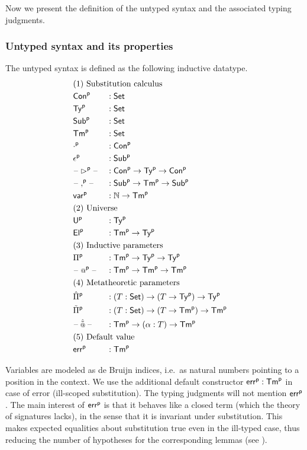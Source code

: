 Now we present the definition of the untyped syntax and the
associated typing judgments.

\subsubsection{Untyped syntax and its properties}

\begin{definition}
The untyped syntax is defined as the following inductive datatype.
\begin{alignat*}{5}
  & \rlap{(1) Substitution calculus} \\
  & \Conu && : \Set \\
  & \Tyu  && : \Set \\
  & \Subu  && : \Set \\
  & \Tmu  && : \Set \\
  & \emptyu && : \Conu \\
    & \epsilonu && : \Subu \\
  & \blank\extu\blank && : \Conu\ra\Tyu\ra\Conu \\
  & \blank\consu\blank && : \Subu\ra\Tmu\ra\Subu \\
  & \varu  && : \N \ra \Tmu \\
  & \rlap{(2) Universe} \\
  & \Uu && : \Tyu \\
  & \Elu && : \Tmu\ra\Tyu \\
  & \rlap{(3) Inductive parameters} \\
  & \Piu && : \Tmu\ra\Tyu\ra\Tyu \\
  & \blank\appu\blank && : \Tmu\ra\Tmu\ra \Tmu \\
  & \rlap{(4) Metatheoretic parameters} \\
  & \Pimu && : (T:\Set)\ra(T\ra\Tyu)\ra\Tyu \\
  & \Piiu && : (T:\Set)\ra(T\ra\Tmu)\ra\Tmu \\
  & \blank\appmu \blank && : \Tmu\ra(\alpha:T) \ra\Tmu\\
  & \rlap{(5) Default value} \\
  & \erru && : \Tmu
\end{alignat*}
\end{definition}
Variables are modeled as de Bruijn indices, i.e.\ as natural numbers
pointing to a position in the context. We use the additional default
constructor ${\mathsf{err}}^{\mathsf{p}}:{\mathsf{Tm}}^{\mathsf{p}}$ in case of error (ill-scoped
substitution). The typing judgments will not mention ${\mathsf{err}}^{\mathsf{p}}$.  The
main interest of ${\mathsf{err}}^{\mathsf{p}}$ is that it behaves like a closed term (which
the theory of signatures lacks), in the sense that it is invariant
under substitution. This makes expected equalities about substitution
true even in the ill-typed case, thus reducing the number of
hypotheses for the corresponding lemmas (see
).

